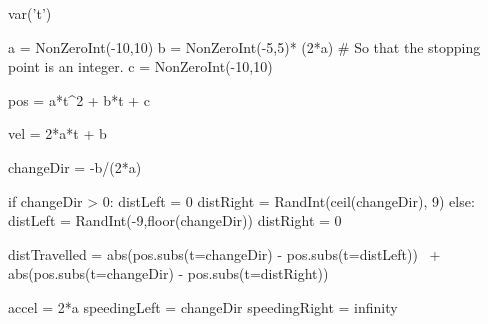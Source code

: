
\begin{sagesilent}

var('t')

a = NonZeroInt(-10,10)
b = NonZeroInt(-5,5)* (2*a) # So that the stopping point is an integer.
c = NonZeroInt(-10,10)

pos = a*t^2 + b*t + c

vel = 2*a*t + b

changeDir = -b/(2*a)

if changeDir > 0:
    distLeft = 0
    distRight = RandInt(ceil(changeDir), 9)
else:
    distLeft = RandInt(-9,floor(changeDir))
    distRight = 0

distTravelled =   abs(pos.subs(t=changeDir) - pos.subs(t=distLeft)) \
                + abs(pos.subs(t=changeDir) - pos.subs(t=distRight))

accel = 2*a 
speedingLeft = changeDir
speedingRight = infinity

\end{sagesilent}

